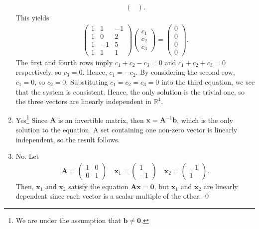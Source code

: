 \documentclass[12pt]{article}
\begin{document}
\begin{enumerate}[label=\textbf{(\alph*)}]
\begin{align*}
\begin{pmatrix}
        \end{pmatrix}.
    \end{align*}
    This yields \begin{align*}
        \begin{pmatrix}
            1&1&-1\\1&0&2\\1&-1&5\\1&1&1
        \end{pmatrix}\begin{pmatrix}
            c_1\\c_2\\c_3
        \end{pmatrix}=\begin{pmatrix}
            0\\0\\0\\0
        \end{pmatrix}.
    \end{align*}
    The first and fourth rows imply $c_1+c_2-c_3=0$ and $c_1+c_2+c_3=0$ respectively, so $c_3=0$. Hence, $c_1=-c_2$. By considering the second row, $c_1=0$, so $c_2=0$. Substituting $c_1=c_2=c_3=0$ into the third equation, we see that the system is consistent. Hence, the only solution is the trivial one, so the three vectors are linearly independent in $\mathbb{R}^4$.
    \item Yes\footnote{We are under the assumption that $\mathbf{b}\ne \mathbf{0}$.} Since $\mathbf{A}$ is an invertible matrix, then $\mathbf{x}=\mathbf{A}^{-1}\mathbf{b}$, which is the only solution to the equation. A set containing one non‑zero vector is linearly independent, so the result follows. 
    \item No. Let \begin{align*}
        \mathbf{A}=\begin{pmatrix}
            1&0\\0&1
        \end{pmatrix}\quad \mathbf{x}_1=\begin{pmatrix}
            1\\-1
        \end{pmatrix}\quad \mathbf{x}_2=\begin{pmatrix}
            -1\\1
        \end{pmatrix}.
    \end{align*}
    Then, $\mathbf{x}_1$ and $\mathbf{x}_2$ satisfy the equation $\mathbf{Ax}=\mathbf{0}$, but $\mathbf{x}_1$ and $\mathbf{x}_2$ are linearly dependent since each vector is a scalar multiple of the other. \qed 
\end{enumerate}
\end{document}
